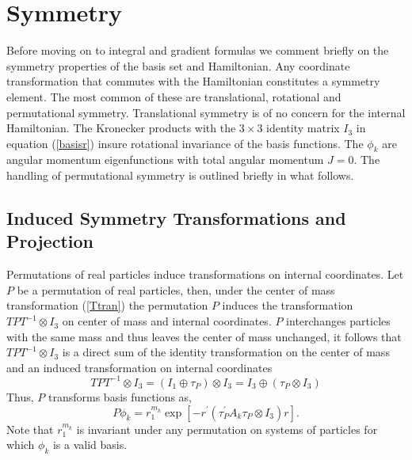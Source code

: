 \documentclass[12pt,doublespace]{article}
\begin{document}
\section{Symmetry}

Before moving on to integral and gradient formulas we comment briefly on the
symmetry properties of the basis set and Hamiltonian. Any coordinate
transformation that commutes with the Hamiltonian constitutes a symmetry
element. The most common of these are translational, rotational and
permutational symmetry. Translational symmetry is of no concern for the
internal Hamiltonian. The Kronecker products with the $3\times 3$ identity
matrix $I_{3}$ in equation (\ref{basisr}) insure rotational invariance of
the basis functions. The $\phi _{k}$ are angular momentum eigenfunctions
with total angular momentum $J=0$. The handling of permutational symmetry is
outlined briefly in what follows.

\subsection{\protect\bigskip Induced Symmetry Transformations and Projection}

Permutations of real particles induce transformations on internal
coordinates. Let $P$ be a permutation of real particles, then, under the
center of mass transformation (\ref{Ttran}) the permutation $P$ induces the
transformation $TPT^{-1}\otimes I_{3}$ on center of mass and internal
coordinates. $P$ interchanges particles with the same mass and thus leaves
the center of mass unchanged, it follows that $TPT^{-1}\otimes I_{3}$ is a
direct sum of the identity transformation on the center of mass and an
induced transformation on internal coordinates 
\begin{equation}
TPT^{-1}\otimes I_{3}=\left( I_{1}\oplus \tau _{P}\right) \otimes
I_{3}=I_{3}\oplus \left( \tau _{P}\otimes I_{3}\right)  \label{TPT}
\end{equation}
Thus, $P$ transforms basis functions as, 
\begin{equation}
P\phi _{k}=r_{1}^{m_{k}}\exp \left[ -r^{\prime }\left( \tau _{P}^{\prime
}A_{k}\tau _{P}\otimes I_{3}\right) r\right] .
\end{equation}
Note that $r_{1}^{m_{k}}$ is invariant under any permutation on systems of
particles for which $\phi _{k}$ is a valid basis.
\end{document}
